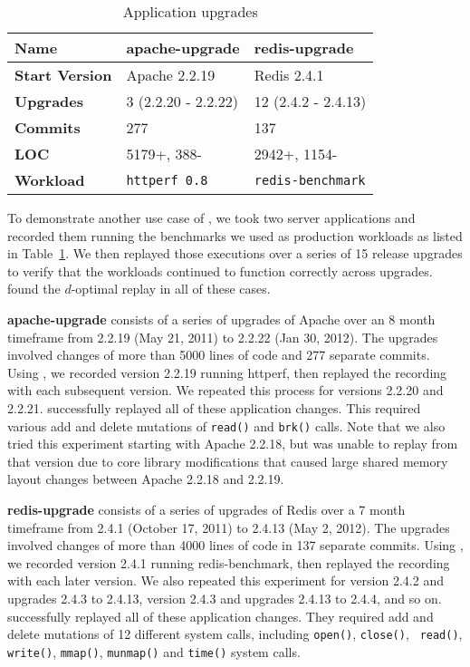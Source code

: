 \begin{table}[t]
\begin{center}
\small
\begin{tabular}{|l|l|l|}   \hline
 {\bf Name}         & apache-upgrade      & redis-upgrade         \\ \hline
{\bf Start Version} & Apache 2.2.19       & Redis 2.4.1           \\ \hline
{\bf Upgrades}      & 3 (2.2.20 - 2.2.22) & 12 (2.4.2 - 2.4.13)   \\ \hline
{\bf Commits}       & 277                 & 137                   \\ \hline
{\bf LOC}           & 5179+, 388-         & 2942+, 1154-          \\ \hline
{\bf Workload}      & {\tt httperf 0.8}   & {\tt redis-benchmark} \\ \hline
\end{tabular}
\end{center}
\vspace{-1em}
\caption{Application upgrades}
\label{dora:tab:upgrades}
\end{table}

To demonstrate another use case of {\dora}, we took two server applications
and recorded them running the benchmarks we used as production
workloads as listed in Table~\ref{dora:tab:upgrades}. We then replayed
those executions over a series of 15 release upgrades to verify that
the workloads continued to function correctly across upgrades. {\dora} found
the $d$-optimal replay in all of these cases.

{\bf apache-upgrade} consists of a series of upgrades of Apache over
an 8 month timeframe from 2.2.19 (May 21, 2011) to 2.2.22 (Jan 30,
2012). The upgrades involved changes of more than 5000 lines of code 
and 277 separate commits. Using {\dora}, we recorded version
2.2.19 running httperf, then replayed the recording with each subsequent
version. We repeated this process for versions 2.2.20 and 2.2.21.
{\dora} successfully replayed all of these
application changes. This required various add and delete mutations of
{\tt read()} and {\tt brk()} calls.  Note that we also tried
this experiment starting with Apache 2.2.18, but {\dora} was unable
to replay from that version due to core library modifications
that caused large shared memory layout changes between Apache 2.2.18
and 2.2.19.

{\bf redis-upgrade} consists of a series of upgrades of Redis over a
7 month timeframe from 2.4.1 (October 17, 2011) to 2.4.13 (May 2,
2012).  The upgrades involved changes of more than 4000 lines of code
in 137 separate commits.  Using {\dora}, we recorded version 2.4.1
running redis-benchmark, then replayed the recording with each later
version. We also repeated this experiment for version 2.4.2 and
upgrades 2.4.3 to 2.4.13, version 2.4.3 and upgrades 2.4.13 to 2.4.4, and so on.
{\dora} successfully replayed all of these
application changes. They required add and delete mutations of
12 different system calls, including {\tt open()}, {\tt close()}, {\tt
read()}, {\tt write()}, {\tt mmap()}, {\tt munmap()} and {\tt time()}
system calls.

